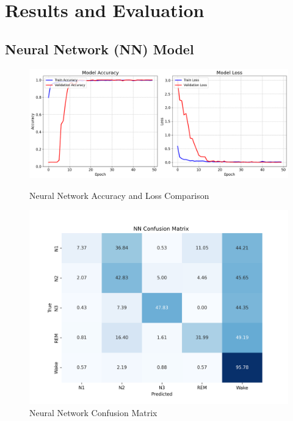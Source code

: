 \section{Results and Evaluation}





\subsection{Neural Network (NN) Model}

\begin{figure}[H]
	\centering
	\begin{minipage}{0.66\textwidth}
		\centering
		\includegraphics[width=\linewidth]{img/paper_2/deeplearning.png}
		\caption{Neural Network Accuracy and Loss Comparison}
		\label{fig:nn_accuracy}
	\end{minipage}
	\hfill
	\begin{minipage}{0.33\textwidth}
		\centering
		\includegraphics[width=\linewidth]{img/paper_2/NN_cm.png}
		\caption{Neural Network Confusion Matrix}
		\label{fig:nn_cm}
	\end{minipage}
\end{figure}


